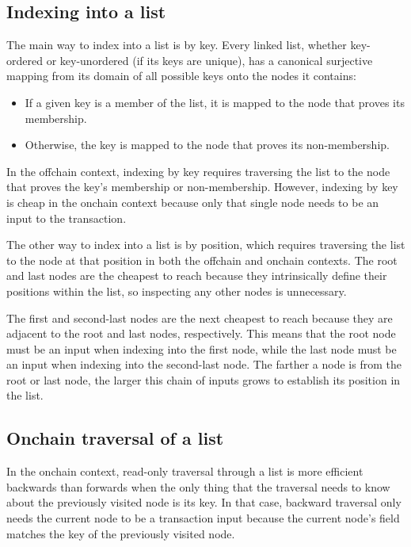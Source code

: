 \documentclass[../midgard.tex]{subfiles}
\begin{document}
\subsection{Indexing into a list}
\label{h:indexing-into-a-list}

The main way to index into a list is by key. Every linked list, whether key-ordered or key-unordered (if its keys are unique), has a canonical surjective mapping from its domain of all possible keys onto the nodes it contains:
\begin{itemize}
    \item If a given key is a member of the list, it is mapped to the node that proves its membership.
    \item Otherwise, the key is mapped to the node that proves its non-membership.
\end{itemize}

In the offchain context, indexing by key requires traversing the list to the node that proves the key's membership or non-membership. However, indexing by key is cheap in the onchain context because only that single node needs to be an input to the transaction.

The other way to index into a list is by position, which requires traversing the list to the node at that position in both the offchain and onchain contexts. The root and last nodes are the cheapest to reach because they intrinsically define their positions within the list, so inspecting any other nodes is unnecessary. 

The first and second-last nodes are the next cheapest to reach because they are adjacent to the root and last nodes, respectively. This means that the root node must be an input when indexing into the first node, while the last node must be an input when indexing into the second-last node. The farther a node is from the root or last node, the larger this chain of inputs grows to establish its position in the list.

\subsection{Onchain traversal of a list}
\label{h:onchain-traversal-list}

In the onchain context, read-only traversal through a list is more efficient backwards than forwards when the only thing that the traversal needs to know about the previously visited node is its key. In that case, backward traversal only needs the current node to be a transaction input because the current node's  field matches the key of the previously visited node.
\end{document}
